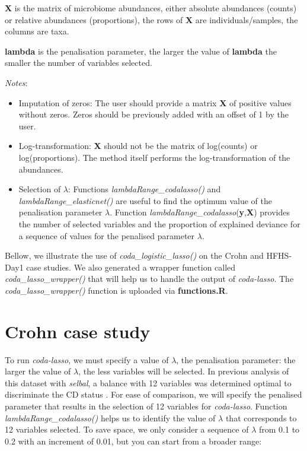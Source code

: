 \documentclass[openany]{book}
\providecommand{\tightlist}{%
  \setlength{\itemsep}{0pt}\setlength{\parskip}{0pt}}
\begin{document}
\textbf{X} is the matrix of microbiome abundances, either absolute
abundances (counts) or relative abundances (proportions), the rows of
\textbf{X} are individuals/samples, the columns are taxa.

\textbf{lambda} is the penalisation parameter, the larger the value of
\textbf{lambda} the smaller the number of variables selected.

\emph{Notes}:

\begin{itemize}
\tightlist
\item
  Imputation of zeros: The user should provide a matrix \textbf{X} of
  positive values without zeros. Zeros should be previously added with
  an offset of 1 by the user.
\item
  Log-transformation: \textbf{X} should not be the matrix of log(counts)
  or log(proportions). The method itself performs the log-transformation
  of the abundances.
\item
  Selection of \(\lambda\): Functions \emph{lambdaRange\_codalasso()}
  and \emph{lambdaRange\_elasticnet()} are useful to find the optimum
  value of the penalisation parameter \(\lambda\). Function
  \emph{lambdaRange\_codalasso}(\textbf{y},\textbf{X}) provides the
  number of selected variables and the proportion of explained deviance
  for a sequence of values for the penalised parameter \(\lambda\).
\end{itemize}

Bellow, we illustrate the use of \emph{coda\_logistic\_lasso()} on the
Crohn and HFHS-Day1 case studies. We also generated a wrapper function
called \emph{coda\_lasso\_wrapper()} that will help us to handle the
output of \emph{coda-lasso}. The \emph{coda\_lasso\_wrapper()} function
is uploaded via \textbf{functions.R}.

\section{Crohn case study}\label{crohn-case-study-2}

To run \emph{coda-lasso}, we must specify a value of \(\lambda\), the
penalisation parameter: the larger the value of \(\lambda\), the less
variables will be selected. In previous analysis of this dataset with
\emph{selbal}, a balance with 12 variables was determined optimal to
discriminate the CD status \citep{rivera2018balances}. For ease of
comparison, we will specify the penalised parameter that results in the
selection of 12 variables for \emph{coda-lasso}. Function
\emph{lambdaRange\_codalasso()} helps us to identify the value of
\(\lambda\) that corresponds to 12 variables selected. To save space, we
only consider a sequence of \(\lambda\) from 0.1 to 0.2 with an
increment of 0.01, but you can start from a broader range:
\end{document}

